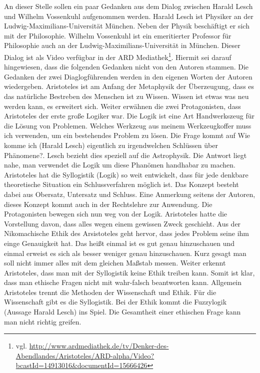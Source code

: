 An dieser Stelle sollen ein paar Gedanken aus dem Dialog zwischen Harald Lesch und Wilhelm Vossenkuhl aufgenommen werden. Harald Lesch ist Physiker an der Ludwig-Maximilians-Universität München. Neben der Physik beschäftigt er sich mit der Philosophie. Wilhelm Vossenkuhl ist ein emeritierter Professor für Philosophie auch an der Ludwig-Maximilians-Universität in München. Dieser Dialog ist als Video verfügbar in der ARD Mediathek\footnote{vgl. \url{http://www.ardmediathek.de/tv/Denker-des-Abendlandes/Aristoteles/ARD-alpha/Video?bcastId=14913016&documentId=15666426}}. Hiermit sei darauf hingewiesen, dass die folgenden Gedanken nicht von den Autoren stammen. Die Gedanken der zwei Diaglogführenden werden in den eigenen Worten der Autoren wiedergeben. \newline
Aristoteles ist am Anfang der Metaphysik der Überzeugung, dass es das natürliche Bestreben des Menschen ist zu Wissen. Wissen ist etwas was neu werden kann, es erweitert sich. Weiter erwähnen die zwei Protagonisten, dass Aristoteles der erste große Logiker war. Die Logik ist eine Art Handwerkszeug für die Lösung von Problemen. Welches Werkzeug aus meinem Werkzeugkoffer muss ich verwenden, um ein bestehendes Problem zu lösen. Die Frage kommt auf \glqq Wie komme ich (Harald Lesch) eigentlich zu irgendwelchen Schlüssen über Phänomene?\grqq. Lesch bezieht dies speziell auf die Astrophysik. Die Antwort liegt nahe, man verwendet die Logik um diese Phanömen handhabar zu machen. Aristoteles hat die Syllogistik (Logik) so weit entwickelt, dass für jede denkbare theoretische Situation ein Schlussverfahren möglich ist. Das Konzept besteht dabei aus Obersatz, Untersatz und Schluss. Eine Anmerkung seitens der Autoren, dieses Konzept kommt auch in der Rechtslehre zur Anwendung. Die Protagonisten bewegen sich nun weg von der Logik. Aristoteles hatte die Vorstellung davon, dass alles wegen einem gewissen Zweck geschieht. Aus der Nikomachische Ethik des Arsistoteles geht hervor, dass jedes Problem seine ihm einge Genauigkeit hat. Das heißt einmal ist es gut genau hinzuschauen und einmal erweist es sich als besser weniger genau hinzuschauen. Kurz gesagt man soll nicht immer alles mit dem gleichen Maßstab messen. Weiter erkennt Aristoteles, dass man mit der Syllogistik keine Ethik treiben kann. Somit ist klar, dass man ethische Fragen nicht mit wahr-falsch beantworten kann. Allgemein Aristoteles trennt die Methoden der Wissenschaft und Ethik. Für die Wissenschaft gibt es die Syllogistik. Bei der Ethik kommt die Fuzzylogik (Aussage Harald Lesch) ins Spiel. Die Gesamtheit einer ethischen Frage kann man nicht richtig greifen. 

